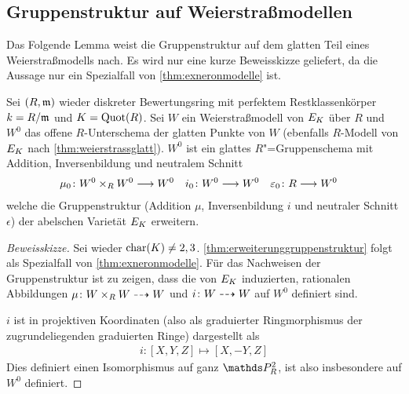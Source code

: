 \subsection{Gruppenstruktur auf Weierstraßmodellen}
Das Folgende Lemma weist die Gruppenstruktur auf dem glatten Teil
eines Weierstraßmodells nach. Es wird nur eine kurze Beweisskizze
geliefert, da die Aussage nur ein Spezialfall von
\ref{thm:exneronmodelle} ist.
\begin{Lemma}\label{thm:erweiterunggruppenstruktur}
  Sei $(R,\mathfrak{m})$ wieder diskreter Bewertungsring
  mit perfektem Restklassenkörper ${k=R/\mathfrak{m}}$ und
  ${K=\operatorname{Quot}(R)}$.
  Sei $W$ ein Weierstraßmodell von $E_{K}$ über $R$ und
  $W^0$ das offene $R$-Unterschema der glatten Punkte von $W$ 
  (ebenfalls $R$-Modell von $E_{K}$ nach \ref{thm:weierstrassglatt}).
  $W^0$ ist ein glattes $R$"=Gruppenschema
  mit Addition, Inversenbildung und neutralem Schnitt
  \begin{align*}
    \mu_0\colon W^0\times_R W^0 &\longrightarrow W^0
    &i_0\colon W^0&\longrightarrow W^0
    &\varepsilon_0\colon R&\longrightarrow W^0
  \end{align*}
  welche die Gruppenstruktur (Addition $\mu$, Inversenbildung $i$ und
  neutraler Schnitt $\epsilon$)
  der abelschen Varietät $E_{K}$ erweitern.

  
  \begin{proof}[Beweisskizze] Sei wieder $\operatorname{char}(K)\neq 2,3$.
    \ref{thm:erweiterunggruppenstruktur} folgt als Spezialfall von
    \ref{thm:exneronmodelle}.
    Für das Nachweisen der Gruppenstruktur ist zu zeigen, dass die von
    $E_{K}$ induzierten, rationalen Abbildungen $\mu\colon W\times_R
    W\dashrightarrow W$ und $i\colon W\dashrightarrow W$ auf $W^0$ definiert sind.

    $i$ ist in projektiven Koordinaten (also als graduierter
    Ringmorphismus der zugrundeliegenden graduierten Ringe)
    dargestellt als
    \begin{gather*}
      i\colon [X,Y,Z]\mapsto [X,-Y,Z]
    \end{gather*}
    Dies definiert einen Isomorphismus auf ganz $\P_R^2$, ist also
    insbesondere auf $W^0$ definiert.


\end{proof}
\end{Lemma}
